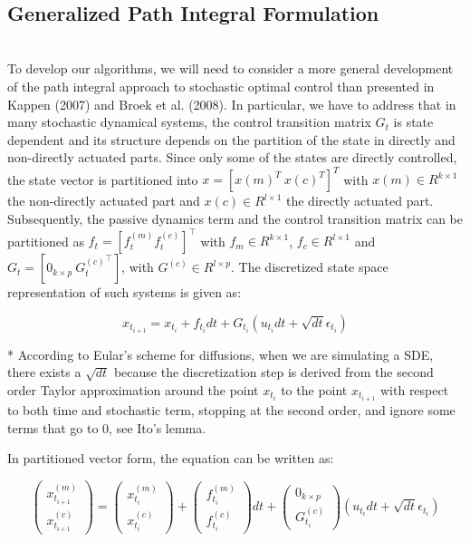 \documentclass[journal]{IEEEtran}
\begin{document}
\ \\
\subsection{Generalized Path Integral Formulation}
  \ \\

To develop our algorithms, we will need to consider a more general development of the path integral approach to stochastic optimal control than presented in Kappen (2007) and Broek et al. (2008). 
In particular, we have to address that in many stochastic dynamical systems,
 the control transition matrix $G_t$ is state dependent and its structure depends on the partition of the state in directly and non-directly actuated parts. Since only some of the states are directly controlled, the state vector
 is partitioned into $x = [x(m)^T \ x(c)^T ]^T$ with $x(m) \in R^{k\times 1}$ the non-directly actuated part and $x(c) \in R^{l\times 1}$ the directly actuated part. Subsequently, the passive dynamics term and the control transition
 matrix can be partitioned as $f_t =[f_t^{(m)} f_t^{(c)} ]^{\top}$ with $f_m \in R^{k\times 1}$, $f_c \in R^{l\times 1}$ and $G_t = [0_{k\times p} \ {G_t^{(c)}}^{\top}]$, with $G^{(c)} \in R^{l\times p}$. The discretized state space representation of such systems is given as:
 
 \begin{equation}
  x_{t_{i+1}} =x_{t_i} +f_{t_i}dt+G_{t_i} (u_{t_i}dt+\sqrt{dt}\epsilon_{t_i})\nonumber
 \end{equation}

 * According to Eular's scheme for diffusions, when we are simulating a SDE, there exists a $\sqrt{dt}$ because the discretization step is derived from the second order Taylor approximation around the point $x_{t_i}$ to the point $x_{t_{i+1}}$ with respect to both time and stochastic term, stopping at the second order,
 and ignore some terms that go to 0, see Ito's lemma.
 
 In partitioned vector form, the equation can be written as:

 \begin{equation}
 \begin{pmatrix}x_{t_{i+1}}^{(m)} \\ x_{t_{i+1}}^{(c)} \end{pmatrix}=\begin{pmatrix}x_{t_{i}}^{(m)} \\ x_{t_{i}}^{(c)} \end{pmatrix} +\begin{pmatrix}f_{t_i}^{(m)} \\ f_{t_i}^{(c)}\end{pmatrix}dt+\begin{pmatrix}0_{k\times p}\\G_{t_i}^{(c)}  \end{pmatrix} (u_{t_i}dt+\sqrt{dt}\epsilon_{t_i})
 \label{discretized form}
\end{equation}
\end{document}
